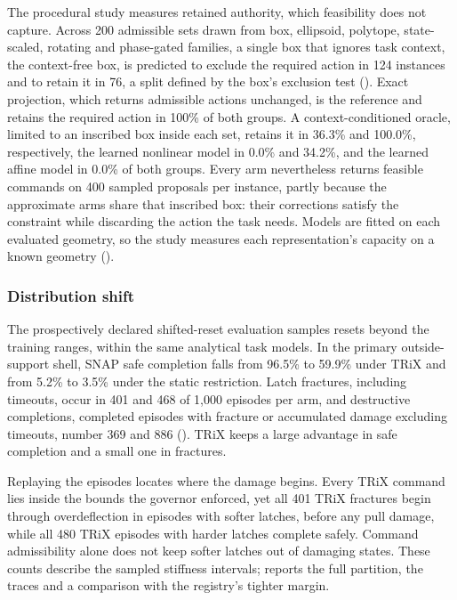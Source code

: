 \documentclass[12pt]{article}
\begin{document}
The procedural study measures retained authority, which feasibility does not capture. Across 200
admissible sets drawn from box, ellipsoid, polytope, state-scaled, rotating and
phase-gated families, a single box that ignores task context, the context-free
box, is predicted to exclude the required action in 124 instances and to retain it in 76, a split defined by the box's exclusion test (). Exact
projection, which returns admissible actions unchanged, is the reference and retains
the required action in 100\% of both groups. A
context-conditioned oracle, limited to an inscribed box inside each set, retains
it in 36.3\% and 100.0\%, respectively, the learned nonlinear model in 0.0\% and
34.2\%, and the learned affine model in 0.0\% of both groups. Every arm nevertheless returns feasible commands on 400 sampled proposals
per instance, partly because the approximate arms share that inscribed box:
their corrections satisfy the constraint while discarding the action the task needs.
Models are fitted on each evaluated geometry, so the study measures each
representation's capacity on a known geometry ().

\subsubsection{Distribution shift}
\label{sec:ood-results}
The prospectively
declared shifted-reset evaluation samples resets beyond the training ranges,
within the same analytical task models. In the primary outside-support shell,
SNAP safe completion falls from 96.5\% to 59.9\% under TRiX and from 5.2\% to
3.5\% under the static restriction. Latch fractures, including timeouts, occur
in 401 and 468 of 1,000 episodes per arm, and destructive completions,
completed episodes with fracture or accumulated damage excluding timeouts,
number 369 and 886 (). TRiX keeps a large
advantage in safe completion and a small one in fractures.

Replaying the episodes locates where the damage begins. Every TRiX command lies
inside the bounds the governor enforced, yet all 401 TRiX fractures begin
through overdeflection in episodes with softer latches, before any pull damage,
while all 480 TRiX episodes with harder latches complete safely. Command admissibility alone does not keep softer latches out of damaging states. These counts describe the sampled stiffness intervals;
 reports the full partition, the traces and a comparison
with the registry's tighter margin.
\end{document}
